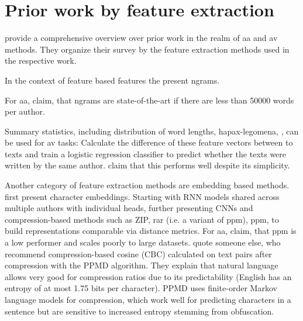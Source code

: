 \section{Prior work by feature extraction}
\label{sec:prior_work_by_feat_extraction}

\citet{tyo_state_2022} provide a comprehensive overview over prior work in the realm of \ac{aa} and \ac{av} methods.
They organize their survey by the feature extraction methods used in the respective work.

In the context of feature based features the present ngrams.

For \ac{aa}, \citet{tyo_state_2022} claim, that ngrams are state-of-the-art if there are less than 50000 words per author.

Summary statistics, including distribution of word lengths, hapax-legomena, , 
can be used for \ac{av} tasks: 
Calculate the difference of these feature vectors between to texts and train a logistic regression classifier 
to predict whether the texts were written by the same author.
\citet{tyo_state_2022} claim that this performs well despite its simplicity.


Another category of feature extraction methods are embedding based methods.
\citet{tyo_state_2022} first present character embeddings.
Starting with RNN models shared across multiple authors with individual heads, 
further presenting CNNs and %
compression-based methods such as ZIP, \ac{rar} (i.e. a variant of \ac{ppm}), \ac{ppm}, 
to build representations comparable via distance metrics.
For \ac{aa}, \citet{tyo_state_2022} claim, that \ac{ppm} is a low performer and scales poorly to large datasets.
\citet{bevendorff_divergence_based_2020} quote someone else, who recommend compression-based cosine (CBC) calculated on text pairs after compression with the PPMD algorithm.
They explain that natural language allows very good for compression ratios due to its predictability (English has an entropy of at most 1.75 bits per character).
PPMD uses finite-order Markov language models for compression, which work well for predicting characters in a sentence but are sensitive to increased entropy stemming from obfuscation.

